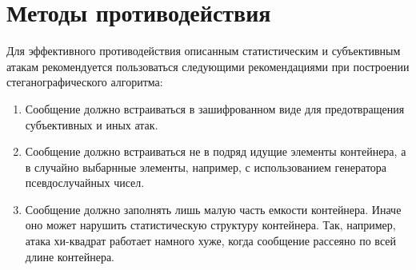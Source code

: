 \section{Методы противодействия}
Для эффективного противодействия описанным статистическим и субъективным
атакам рекомендуется пользоваться следующими рекомендациями при построении
стеганографического алгоритма:
\begin{enumerate}
    \item Сообщение должно встраиваться в зашифрованном виде для предотвращения
    субъективных и иных атак.
    \item Сообщение должно встраиваться не в подряд идущие элементы контейнера,
    а в случайно выбарнные элементы, например, с использованием генератора псевдослучайных
    чисел.
    \item Сообщение должно заполнять лишь малую часть емкости контейнера. Иначе
    оно может нарушить статистическую структуру контейнера. Так, например,
    атака хи-квадрат работает намного хуже, когда сообщение рассеяно по всей длине контейнера.
\end{enumerate}